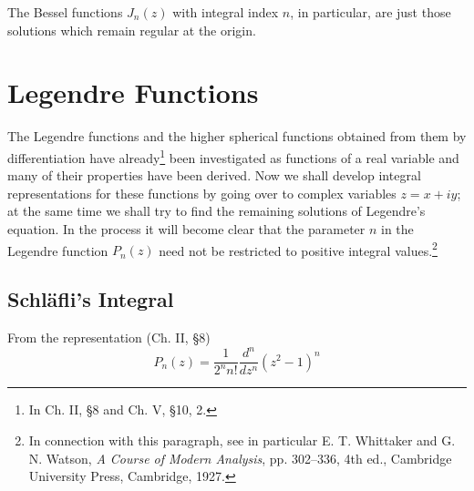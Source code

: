 The Bessel functions $J_n(z)$ with integral index $n$, in particular, are just those solutions which remain regular at the origin.

\section{Legendre Functions}
The Legendre functions and the higher spherical functions obtained from them by differentiation have already\footnote{In Ch. II, \S8 and Ch. V, \S10, 2.} been investigated as functions of a real variable and many of their properties have been derived. Now we shall develop integral representations for these functions by going over to complex variables $z=x+iy$; at the same time we shall try to find the remaining solutions of Legendre's equation. In the process it will become clear that the parameter $n$ in the Legendre function $P_n(z)$ need not be restricted to positive integral values.\footnote{In connection with this paragraph, see in particular E. T. Whittaker and G. N. Watson, \emph{A Course of Modern Analysis}, pp. 302--336, 4th ed., Cambridge University Press, Cambridge, 1927.}

\subsection{Schl\"afli's Integral}
From the representation (Ch. II, \S8)
\[
P_n(z)=\frac1{2^nn!}\frac{d^n}{dz^n}(z^2-1)^n
\]

